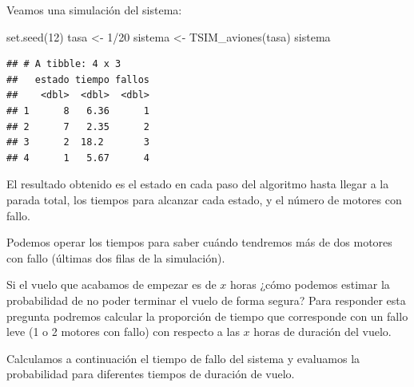 \documentclass[
]{book}
\newenvironment{Shaded}{\begin{snugshade}}{\end{snugshade}}
\newcommand{\DecValTok}[1]{\textcolor[rgb]{0.00,0.00,0.81}{#1}}
\newcommand{\FunctionTok}[1]{\textcolor[rgb]{0.00,0.00,0.00}{#1}}
\newcommand{\NormalTok}[1]{#1}
\newcommand{\OtherTok}[1]{\textcolor[rgb]{0.56,0.35,0.01}{#1}}
\newcommand{\SpecialCharTok}[1]{\textcolor[rgb]{0.00,0.00,0.00}{#1}}
\theoremstyle{definition}
\theoremstyle{definition}
\theoremstyle{definition}
\theoremstyle{definition}
\theoremstyle{remark}
\begin{document}
Veamos una simulación del sistema:

\begin{Shaded}
\begin{Highlighting}[]
\FunctionTok{set.seed}\NormalTok{(}\DecValTok{12}\NormalTok{)}
\NormalTok{tasa }\OtherTok{\textless{}{-}} \DecValTok{1}\SpecialCharTok{/}\DecValTok{20}
\NormalTok{sistema }\OtherTok{\textless{}{-}} \FunctionTok{TSIM\_aviones}\NormalTok{(tasa)}
\NormalTok{sistema}
\end{Highlighting}
\end{Shaded}

\begin{verbatim}
## # A tibble: 4 x 3
##   estado tiempo fallos
##    <dbl>  <dbl>  <dbl>
## 1      8   6.36      1
## 2      7   2.35      2
## 3      2  18.2       3
## 4      1   5.67      4
\end{verbatim}

El resultado obtenido es el estado en cada paso del algoritmo hasta llegar a la parada total, los tiempos para alcanzar cada estado, y el número de motores con fallo.

Podemos operar los tiempos para saber cuándo tendremos más de dos motores con fallo (últimas dos filas de la simulación).

Si el vuelo que acabamos de empezar es de \(x\) horas ¿cómo podemos estimar la probabilidad de no poder terminar el vuelo de forma segura? Para responder esta pregunta podremos calcular la proporción de tiempo que corresponde con un fallo leve (1 o 2 motores con fallo) con respecto a las \(x\) horas de duración del vuelo.

Calculamos a continuación el tiempo de fallo del sistema y evaluamos la probabilidad para diferentes tiempos de duración de vuelo.
\end{document}
